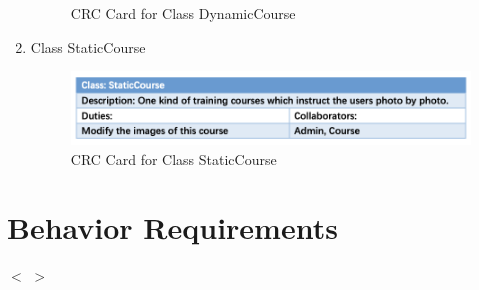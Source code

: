 \documentclass[16pt]{scrreprt}
\begin{document}
\begin{enumerate}
\begin{figure}[H]
			\caption{CRC Card for Class DynamicCourse}
			\label{fig:dynamic}
		\end{figure}
	\item Class StaticCourse
		\begin{figure}[H]
			\centering
			\includegraphics[width=1.1\textwidth]{figures/static.png}
			\caption{CRC Card for Class StaticCourse}
			\label{fig:static}
		\end{figure}
\end{enumerate}
\section{Behavior Requirements}
$<$ $>$


\end{document}
